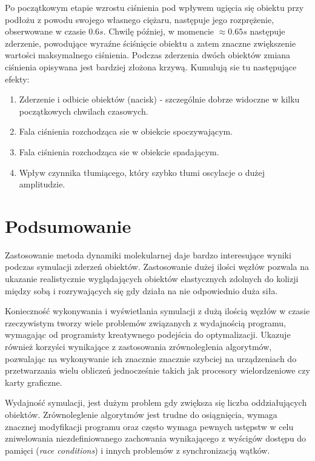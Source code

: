 \documentclass[12pt, letterpaper]{report}
\begin{document}
    Po początkowym etapie wzrostu ciśnienia pod wpływem ugięcia się obiektu przy podłożu 
    z powodu swojego własnego ciężaru, następuje jego rozprężenie, obserwowane w czasie $0.6s$.
    Chwilę później, w momencie $\approx 0.65 s$ następuje zderzenie, powodujące wyraźne 
    ściśnięcie obiektu a zatem znaczne zwiększenie wartości maksymalnego ciśnienia. 
    Podczas zderzenia dwóch obiektów zmiana ciśnienia opisywana jest bardziej złożona krzywą.
    Kumulują sie tu następujące efekty:

    \begin{enumerate}
        \item Zderzenie i odbicie obiektów (nacisk) - szczególnie dobrze widoczne w kilku początkowych chwilach czasowych.
        \item Fala ciśnienia rozchodząca sie w obiekcie spoczywającym.
        \item Fala ciśnienia rozchodząca sie w obiekcie spadającym.
        \item Wpływ czynnika tłumiącego, który szybko tłumi oscylacje o dużej amplitudzie.
    \end{enumerate}

\chapter{Podsumowanie}
    Zastosowanie metoda dynamiki molekularnej daje bardzo interesujące 
    wyniki podczas symulacji zderzeń obiektów. Zastosowanie dużej ilości węzłów pozwala na 
    ukazanie realistycznie wyglądających obiektów elastycznych zdolnych do kolizji między sobą 
    i rozrywających się gdy działa na nie odpowiednio duża siła.
    
    Konieczność wykonywania i wyświetlania symulacji z dużą ilością węzłów w czasie 
    rzeczywistym tworzy wiele problemów związanych z wydajnością programu, wymagając
    od programisty kreatywnego podejścia do optymalizacji. Ukazuje również korzyści wynikające z 
    zastosowania zrównoleglenia algorytmów, pozwalając na wykonywanie ich znacznie znacznie szybciej na 
    urządzeniach do przetwarzania wielu obliczeń 
    jednocześnie takich jak procesory wielordzeniowe czy karty graficzne.

    Wydajność symulacji, jest dużym problem gdy zwiększa się liczba oddziałujących obiektów. 
    Zrównoleglenie algorytmów jest trudne do osiągnięcia, wymaga znacznej modyfikacji programu oraz często 
    wymaga pewnych ustępstw w celu zniwelowania niezdefiniowanego zachowania wynikającego z wyścigów 
    dostępu do pamięci (\emph{race conditions}) i innych problemów z synchronizacją wątków.
\end{document}

